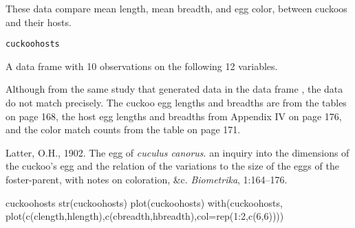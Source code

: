 \begin{Description}\relax
These data compare mean length, mean breadth, and egg color,
between cuckoos and their hosts.
\end{Description}
\begin{Usage}
\begin{verbatim}cuckoohosts\end{verbatim}
\end{Usage}
\begin{Format}\relax
A data frame with 10 observations on the following 12 variables.
\end{Format}
\begin{Details}\relax
Although from the same study that generated data in the data frame
, the data do not match precisely.  The cuckoo egg
lengths and breadths are from the tables on page 168, the host egg
lengths and breadths from Appendix IV on page 176, and the color
match counts from the table on page 171.
\end{Details}
\begin{Source}\relax
Latter, O.H., 1902.
The egg of {\it cuculus canorus}. an inquiry into the dimensions of
the cuckoo's egg and the relation of the variations to the size of the eggs
of the foster-parent, with notes on coloration, \&c.
{\em Biometrika}, 1:164--176.
\end{Source}
\begin{Examples}
\begin{ExampleCode}
cuckoohosts
str(cuckoohosts)
plot(cuckoohosts)
with(cuckoohosts,
     plot(c(clength,hlength),c(cbreadth,hbreadth),col=rep(1:2,c(6,6))))
\end{ExampleCode}
\end{Examples}

